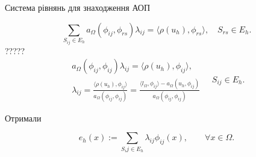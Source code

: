 \begin{frame}{Система рівнянь для знаходження АОП}

	\begin{equation}\label{eq:AEE_system}
		\sum \limits_{S_{ij} \in E_h} a_\Omega(\phi_{ij}, \phi_{rs}) \lambda_{ij} = \langle \rho(u_h), \phi_{rs} \rangle, \quad S_{rs} \in E_h.
	\end{equation}
	{\huge{?????}}
	\begin{equation}
		\begin{split}
			a_\Omega(\phi_{ij}, \phi_{ij}) \lambda_{ij} = \langle \rho(u_h), \phi_{ij} \rangle ,\\
			\lambda_{ij} = \frac{\langle \rho(u_h), \phi_{ij} \rangle}{a_\Omega(\phi_{ij}, \phi_{ij})}
				= \frac{\langle l_\Omega, \phi_{ij}\rangle - a_\Omega(u_h, \phi_{ij})}{a_\Omega(\phi_{ij}, \phi_{ij})}
		\end{split}
		\quad S_{ij} \in E_h.
	\end{equation}

	Отримали

	\begin{equation}\label{eq:AEE_final}
		e_h(x) := \sum \limits_{S_ij \in E_h} \lambda_{ij} \phi_{ij}(x), \qquad \forall x \in \Omega.
	\end{equation}


\end{frame}
